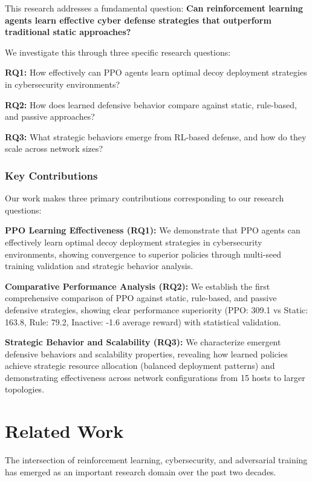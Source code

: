 \documentclass[12pt,oneside]{article}
\begin{document}
This research addresses a fundamental question: \textbf{Can reinforcement learning agents learn effective cyber defense strategies that outperform traditional static approaches?} 

We investigate this through three specific research questions:

\textbf{RQ1:} How effectively can PPO agents learn optimal decoy deployment strategies in cybersecurity environments?

\textbf{RQ2:} How does learned defensive behavior compare against static, rule-based, and passive approaches?

\textbf{RQ3:} What strategic behaviors emerge from RL-based defense, and how do they scale across network sizes?

\subsubsection{Key Contributions}

Our work makes three primary contributions corresponding to our research questions:

\textbf{PPO Learning Effectiveness (RQ1):} We demonstrate that PPO agents can effectively learn optimal decoy deployment strategies in cybersecurity environments, showing convergence to superior policies through multi-seed training validation and strategic behavior analysis.

\textbf{Comparative Performance Analysis (RQ2):} We establish the first comprehensive comparison of PPO against static, rule-based, and passive defensive strategies, showing clear performance superiority (PPO: 309.1 vs Static: 163.8, Rule: 79.2, Inactive: -1.6 average reward) with statistical validation.

\textbf{Strategic Behavior and Scalability (RQ3):} We characterize emergent defensive behaviors and scalability properties, revealing how learned policies achieve strategic resource allocation (balanced deployment patterns) and demonstrating effectiveness across network configurations from 15 hosts to larger topologies.



\clearpage
\section{Related Work}

The intersection of reinforcement learning, cybersecurity, and adversarial training has emerged as an important research domain over the past two decades. 
\end{document}
